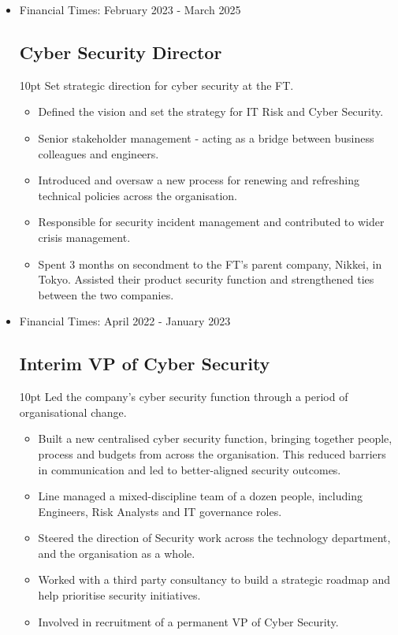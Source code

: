 \documentclass[a4paper]{article}
\newenvironment{detail}{\begin{adjustwidth}{10pt}{}}{\end{adjustwidth}}
\begin{document}
\begin{itemize}


\item Financial Times: February 2023 - March 2025
\subsection*{Cyber Security Director}
\begin{detail}
Set strategic direction for cyber security at the FT.

\begin{itemize}
	\item Defined the vision and set the strategy for IT Risk and Cyber Security.
	\item Senior stakeholder management - acting as a bridge between business colleagues and engineers.
	\item Introduced and oversaw a new process for renewing and refreshing technical policies across the organisation.
	\item Responsible for security incident management and contributed to wider crisis management.
	\item Spent 3 months on secondment to the FT's parent company, Nikkei, in Tokyo.  Assisted their product security function and strengthened ties between the two companies.
\end{itemize}
\end{detail}

\item Financial Times: April 2022 - January 2023
\subsection*{Interim VP of Cyber Security}
\begin{detail}
Led the company's cyber security function through a period of organisational change.

\begin{itemize}
	\item Built a new centralised cyber security function, bringing together people, process and budgets from across the organisation.  This reduced barriers in communication and led to better-aligned security outcomes.
	\item Line managed a mixed-discipline team of a dozen people, including Engineers, Risk Analysts and IT governance roles.
	\item Steered the direction of Security work across the technology department, and the organisation as a whole.
	\item Worked with a third party consultancy to build a strategic roadmap and help prioritise security initiatives.
	\item Involved in recruitment of a permanent VP of Cyber Security.
\end{itemize}
\end{detail}


\end{itemize}
\end{document}
